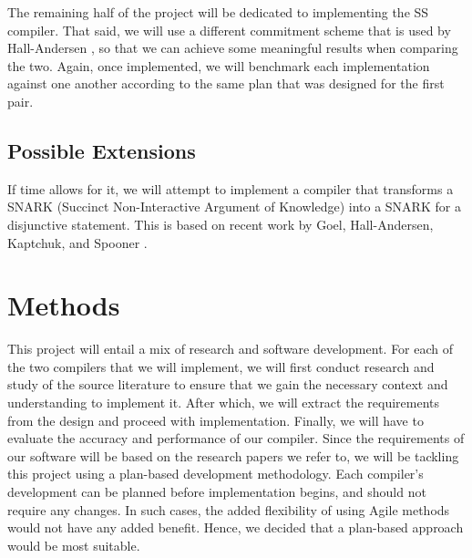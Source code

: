 \documentclass[a4paper,fleqn,12pt]{article}
\begin{document}
The remaining half of the project will be dedicated to implementing the SS compiler. That said, we will use a different commitment scheme that is used by Hall-Andersen \cite{MHAStackSig}, so that we can achieve some meaningful results when comparing the two. Again, once implemented, we will benchmark each implementation against one another according to the same plan that was designed for the first pair.

\subsection{Possible Extensions}

If time allows for it, we will attempt to implement a compiler that transforms a SNARK (Succinct Non-Interactive Argument of Knowledge) into a SNARK for a disjunctive statement. This is based on recent work by Goel, Hall-Andersen, Kaptchuk, and Spooner \cite{SpeedStacking}.



\section{Methods}
This project will entail a mix of research and software development. For each of the two compilers that we will implement, we will first conduct research and study of the source literature to ensure that we gain the necessary context and understanding to implement it. After which, we will extract the requirements from the design and proceed with implementation. Finally, we will have to evaluate the accuracy and performance of our compiler. Since the requirements of our software will be based on the research papers we refer to, we will be tackling this project using a plan-based development methodology. Each compiler's development can be planned before implementation begins, and should not require any changes. In such cases, the added flexibility of using Agile methods would not have any added benefit. Hence, we decided that a plan-based approach would be most suitable.
\end{document}
